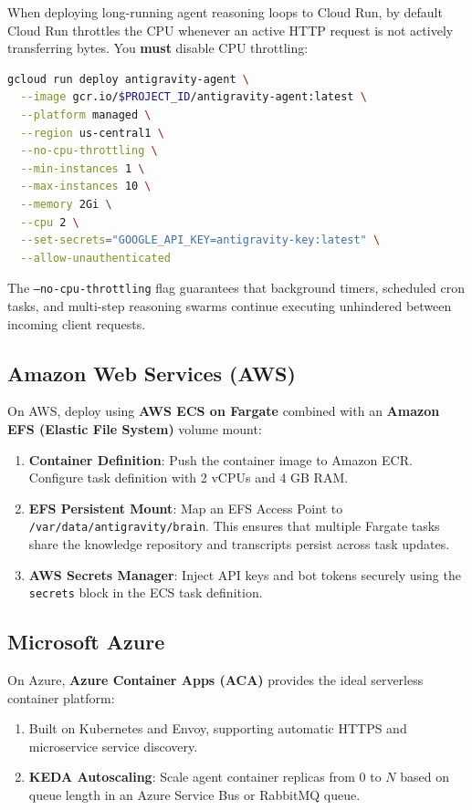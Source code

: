 \documentclass[11pt,a4paper,oneside]{book}
\begin{document}
\begin{probox}
When deploying long-running agent reasoning loops to Cloud Run, by default Cloud Run throttles the CPU whenever an active HTTP request is not actively transferring bytes. You \textbf{must} disable CPU throttling:
\begin{lstlisting}[language=bash]
gcloud run deploy antigravity-agent \
  --image gcr.io/$PROJECT_ID/antigravity-agent:latest \
  --platform managed \
  --region us-central1 \
  --no-cpu-throttling \
  --min-instances 1 \
  --max-instances 10 \
  --memory 2Gi \
  --cpu 2 \
  --set-secrets="GOOGLE_API_KEY=antigravity-key:latest" \
  --allow-unauthenticated
\end{lstlisting}
The \texttt{--no-cpu-throttling} flag guarantees that background timers, scheduled cron tasks, and multi-step reasoning swarms continue executing unhindered between incoming client requests.
\end{probox}

\subsection{Amazon Web Services (AWS)}
On AWS, deploy using \textbf{AWS ECS on Fargate} combined with an \textbf{Amazon EFS (Elastic File System)} volume mount:
\begin{enumerate}
    \item \textbf{Container Definition}: Push the container image to Amazon ECR. Configure task definition with 2 vCPUs and 4 GB RAM.
    \item \textbf{EFS Persistent Mount}: Map an EFS Access Point to \texttt{/var/data/antigravity/brain}. This ensures that multiple Fargate tasks share the knowledge repository and transcripts persist across task updates.
    \item \textbf{AWS Secrets Manager}: Inject API keys and bot tokens securely using the \texttt{secrets} block in the ECS task definition.
\end{enumerate}

\subsection{Microsoft Azure}
On Azure, \textbf{Azure Container Apps (ACA)} provides the ideal serverless container platform:
\begin{enumerate}
    \item Built on Kubernetes and Envoy, supporting automatic HTTPS and microservice service discovery.
    \item \textbf{KEDA Autoscaling}: Scale agent container replicas from 0 to $N$ based on queue length in an Azure Service Bus or RabbitMQ queue.
\end{enumerate}
\end{document}
